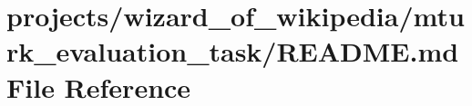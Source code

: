 \hypertarget{projects_2wizard__of__wikipedia_2mturk__evaluation__task_2README_8md}{}\section{projects/wizard\+\_\+of\+\_\+wikipedia/mturk\+\_\+evaluation\+\_\+task/\+R\+E\+A\+D\+ME.md File Reference}
\label{projects_2wizard__of__wikipedia_2mturk__evaluation__task_2README_8md}
